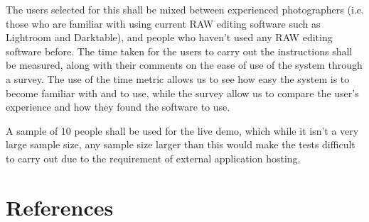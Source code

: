 \documentclass[12pt,a4paper]{article}
\begin{document}
The users selected for this shall be mixed between experienced photographers (i.e. those who are familiar with using current RAW editing software such as Lightroom and Darktable), and
people who haven't used any RAW editing software before. The time taken for the users to carry out the instructions shall be measured, along with their comments on the ease of use of the system through a survey.
The use of the time metric allows us to see how easy the system is to become familiar with and to use, while the survey
allow us to compare the user's experience and how they found the software to use.

A sample of 10 people shall be used for the live demo, which while it isn't a very large sample size,
any sample size larger than this would make the tests difficult to carry out due to the requirement of external
application hosting.

\section{References}

%


\end{document}
